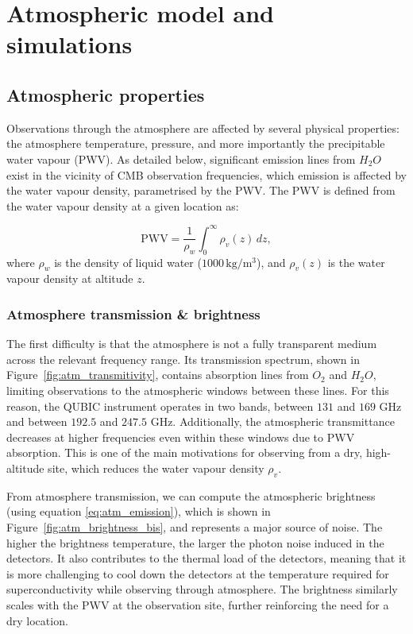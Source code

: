 \documentclass[a4paper,11pt]{article}
\begin{document}
\section{Atmospheric model and simulations}
\label{sec:atm_model}

\subsection{Atmospheric properties}
\label{sec:atm_properties}

Observations through the atmosphere are affected by several physical properties: the atmosphere temperature, pressure, and more importantly the precipitable water vapour (PWV). As detailed below, significant emission lines from $H_2O$ exist in the vicinity of CMB observation frequencies, which emission is affected by the water vapour density, parametrised by the PWV. The PWV is defined from the water vapour density at a given location as:

\begin{equation}
    \mathrm{PWV} = \frac{1}{\rho_w} \int_0^{\infty} \rho_v(z)\, dz,
\end{equation}
where $\rho_w$ is the density of liquid water ($1000\,\mathrm{kg/m^3}$), and $\rho_v(z)$ is the water vapour density at altitude $z$.

\subsubsection{Atmosphere transmission \& brightness}

The first difficulty is that the atmosphere is not a fully transparent medium across the relevant frequency range. Its transmission spectrum, shown in Figure~\ref{fig:atm_transmitivity}, contains absorption lines from $O_2$ and $H_2O$, limiting observations to the atmospheric windows between these lines. For this reason, the QUBIC instrument operates in two bands, between $131$ and $169$ GHz and between $192.5$ and $247.5$ GHz. Additionally, the atmospheric transmittance decreases at higher frequencies even within these windows due to PWV absorption. This is one of the main motivations for observing from a dry, high-altitude site, which reduces the water vapour density $\rho_v$.

From atmosphere transmission, we can compute the atmospheric brightness (using equation \ref{eq:atm_emission}), which is shown in Figure~\ref{fig:atm_brightness_bis}, and represents a major source of noise. The higher the brightness temperature, the larger the photon noise induced in the detectors. It also contributes to the thermal load of the detectors, meaning that it is more challenging to cool down the detectors at the temperature required for superconductivity while observing through atmosphere. The brightness similarly scales with the PWV at the observation site, further reinforcing the need for a dry location.
\end{document}
